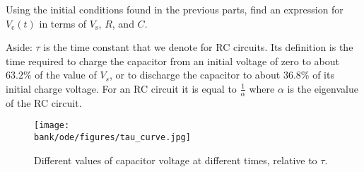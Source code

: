 \begin{enumerate}
\qitem Using the initial conditions found in the previous parts, find an expression for
$V_{\text{c}}(t)$ in terms of $V_{\text{s}}$, $R$, and $C$.




\end{enumerate}

Aside: $\tau$ is the time constant that we denote for RC circuits.
Its definition is the time required to charge the capacitor from an initial voltage of zero to about $63.2\%$ of the value of $V_s$,
or to discharge the capacitor to about $36.8\%$ of its initial charge voltage. For an RC circuit it is equal to $\frac{1}{\alpha}$
where $\alpha$ is the eigenvalue of the RC circuit.


\begin{figure}[!h]
  \centering
  \texttt{[image: \\bank/ode/figures/tau\_curve.jpg]}
  \caption{Different values of capacitor voltage at different times, relative to $\tau.$}
  \label{fig:Tau Curve for Charging RC Circuit}
\end{figure}

